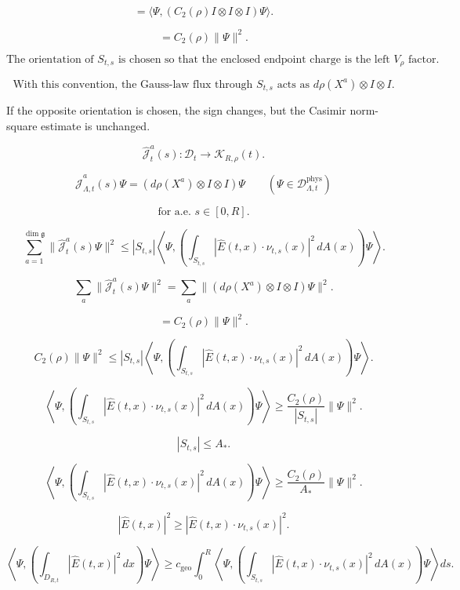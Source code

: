 \documentclass[11pt]{article}
\begin{document}
\[
=
\langle\Psi,(C_2(\rho)I\otimes I\otimes I)\Psi\rangle.
\]

\[
=
C_2(\rho)\|\Psi\|^2.
\]

\[
\text{The orientation of }S_{t,s}\text{ is chosen so that the enclosed endpoint charge is the left }
V_\rho\text{ factor.}
\]

\[
\text{With this convention, the Gauss-law flux through }S_{t,s}
\text{ acts as }
d\rho(X^a)\otimes I\otimes I.
\]

\begin{center}
\parbox{0.9\linewidth}{
If the opposite orientation is chosen, the sign changes, but the Casimir norm-square estimate is unchanged.
}
\end{center}

\[
\widehat{\mathcal J}_t^a(s):\mathscr D_t\to\mathcal K_{R,\rho}(t).
\]

\[
\widehat{\mathcal J}_{\Lambda,t}^a(s)\Psi
=
(d\rho(X^a)\otimes I\otimes I)\Psi
\qquad
(\Psi\in\mathscr D_{\Lambda,t}^{\mathrm{phys}})
\]

\[
\text{for a.e. }s\in[0,R].
\]

\[
\sum_{a=1}^{\dim\mathfrak g}
\|\widehat{\mathcal J}_t^a(s)\Psi\|^2
\le
|S_{t,s}|
\left\langle
\Psi,
\left(
\int_{S_{t,s}}
|\widehat E(t,x)\cdot\nu_{t,s}(x)|^2\,dA(x)
\right)\Psi
\right\rangle.
\]

\[
\sum_a
\|\widehat{\mathcal J}_t^a(s)\Psi\|^2
=
\sum_a
\|(d\rho(X^a)\otimes I\otimes I)\Psi\|^2.
\]

\[
=
C_2(\rho)\|\Psi\|^2.
\]

\[
C_2(\rho)\|\Psi\|^2
\le
|S_{t,s}|
\left\langle
\Psi,
\left(
\int_{S_{t,s}}
|\widehat E(t,x)\cdot\nu_{t,s}(x)|^2\,dA(x)
\right)\Psi
\right\rangle.
\]

\[
\left\langle
\Psi,
\left(
\int_{S_{t,s}}
|\widehat E(t,x)\cdot\nu_{t,s}(x)|^2\,dA(x)
\right)\Psi
\right\rangle
\ge
\frac{C_2(\rho)}{|S_{t,s}|}\|\Psi\|^2.
\]

\[
|S_{t,s}|\le A_\ast.
\]

\[
\left\langle
\Psi,
\left(
\int_{S_{t,s}}
|\widehat E(t,x)\cdot\nu_{t,s}(x)|^2\,dA(x)
\right)\Psi
\right\rangle
\ge
\frac{C_2(\rho)}{A_\ast}\|\Psi\|^2.
\]

\[
|\widehat E(t,x)|^2
\ge
|\widehat E(t,x)\cdot\nu_{t,s}(x)|^2.
\]

\[
\left\langle
\Psi,
\left(
\int_{D_{R,t}}
|\widehat E(t,x)|^2\,dx
\right)\Psi
\right\rangle
\ge
c_{\mathrm{geo}}
\int_0^R
\left\langle
\Psi,
\left(
\int_{S_{t,s}}
|\widehat E(t,x)\cdot\nu_{t,s}(x)|^2\,dA(x)
\right)\Psi
\right\rangle ds.
\]
\end{document}
